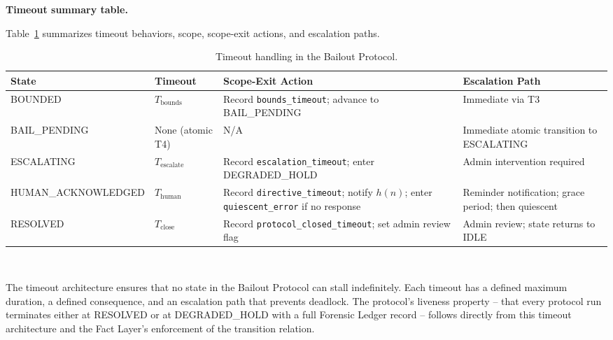 \bigskip
\noindent\textbf{Timeout summary table.}

Table~\ref{tab:timeout-summary} summarizes timeout behaviors, scope, scope-exit actions, and escalation paths.

\begin{table}[htbp]
\centering
\caption{Timeout handling in the Bailout Protocol.}
\label{tab:timeout-summary}
\begin{tabular}{llll}
\toprule
\textbf{State} & \textbf{Timeout} & \textbf{Scope-Exit Action} & \textbf{Escalation Path} \\ \midrule
BOUNDED & $T_{\text{bounds}}$ & Record \texttt{bounds\_timeout}; advance to BAIL\_PENDING & Immediate via T3 \\
BAIL\_PENDING & None (atomic T4) & N/A & Immediate atomic transition to ESCALATING \\
ESCALATING & $T_{\text{escalate}}$ & Record \texttt{escalation\_timeout}; enter DEGRADED\_HOLD & Admin intervention required \\
HUMAN\_ACKNOWLEDGED & $T_{\text{human}}$ & Record \texttt{directive\_timeout}; notify $h(n)$; enter \texttt{quiescent\_error} if no response & Reminder notification; grace period; then quiescent \\
RESOLVED & $T_{\text{close}}$ & Record \texttt{protocol\_closed\_timeout}; set admin review flag & Admin review; state returns to IDLE \\
\bottomrule
\end{tabular}
\\[6pt]
\end{table}

The timeout architecture ensures that no state in the Bailout Protocol can stall indefinitely. Each timeout has a defined maximum duration, a defined consequence, and an escalation path that prevents deadlock. The protocol's liveness property -- that every protocol run terminates either at RESOLVED or at DEGRADED\_HOLD with a full Forensic Ledger record -- follows directly from this timeout architecture and the Fact Layer's enforcement of the transition relation.